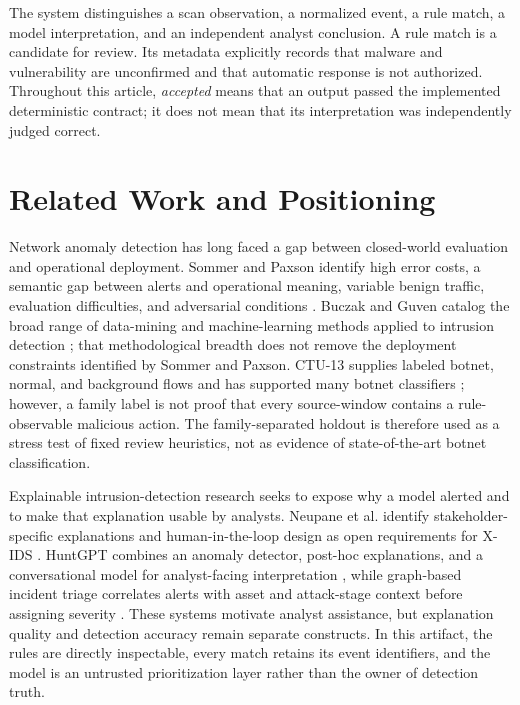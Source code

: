 \documentclass[11pt,a4paper,onecolumn]{IEEEtran}
\begin{document}
The system distinguishes a scan observation, a normalized event, a rule match, a model interpretation, and an independent analyst conclusion. A rule match is a candidate for review. Its metadata explicitly records that malware and vulnerability are unconfirmed and that automatic response is not authorized. Throughout this article, \emph{accepted} means that an output passed the implemented deterministic contract; it does not mean that its interpretation was independently judged correct.

\section{Related Work and Positioning}

Network anomaly detection has long faced a gap between closed-world evaluation and operational deployment. Sommer and Paxson identify high error costs, a semantic gap between alerts and operational meaning, variable benign traffic, evaluation difficulties, and adversarial conditions \cite{sommer2010}. Buczak and Guven catalog the broad range of data-mining and machine-learning methods applied to intrusion detection \cite{buczak2016}; that methodological breadth does not remove the deployment constraints identified by Sommer and Paxson. CTU-13 supplies labeled botnet, normal, and background flows and has supported many botnet classifiers \cite{garcia2014ctu13}; however, a family label is not proof that every source-window contains a rule-observable malicious action. The family-separated holdout is therefore used as a stress test of fixed review heuristics, not as evidence of state-of-the-art botnet classification.

Explainable intrusion-detection research seeks to expose why a model alerted and to make that explanation usable by analysts. Neupane et al. identify stakeholder-specific explanations and human-in-the-loop design as open requirements for X-IDS \cite{neupane2022}. HuntGPT combines an anomaly detector, post-hoc explanations, and a conversational model for analyst-facing interpretation \cite{ali2026huntgpt}, while graph-based incident triage correlates alerts with asset and attack-stage context before assigning severity \cite{sadlek2025}. These systems motivate analyst assistance, but explanation quality and detection accuracy remain separate constructs. In this artifact, the rules are directly inspectable, every match retains its event identifiers, and the model is an untrusted prioritization layer rather than the owner of detection truth.
\end{document}
